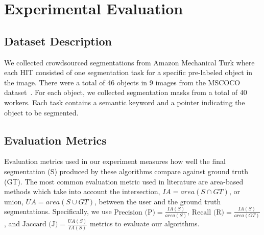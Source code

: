 \section{Experimental Evaluation}
\subsection{Dataset Description}
We collected crowdsourced segmentations from Amazon Mechanical Turk where each HIT consisted of one segmentation task for a specific pre-labeled object in the image. There were a total of 46 objects in 9 images from the MSCOCO dataset~\cite{Lin2014}. For each object, we collected segmentation masks from a total of 40 workers. Each task contains a semantic keyword and a pointer indicating the object to be segmented. %
\subsection{Evaluation Metrics}
\par Evaluation metrics used in our experiment measures how well the final segmentation (S) produced by these algorithms compare against ground truth (GT). The most common evaluation metric used in literature are area-based methods which take into account the intersection, $IA=area(S\cap GT)$, or union, $UA=area(S\cup GT)$, between the user and the ground truth segmentations. Specifically, we use
    $\text{Precision (P)} = \frac{IA(S)}{area(S)}$, 
    $\text{Recall (R)} = \frac{IA(S)}{area(GT)}$, and 
    $\text{Jaccard (J)} = \frac{UA(S)}{IA(S)}$
    metrics to evaluate our algorithms.
